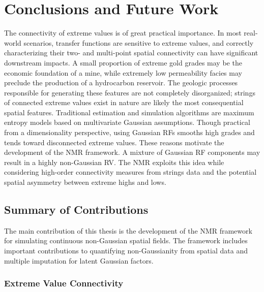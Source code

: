 
\chapter{Conclusions and Future Work}
\label{ch:07conclusions}

The connectivity of extreme values is of great practical importance. In most real-world scenarios, transfer functions are sensitive to extreme values, and correctly characterizing their two- and multi-point spatial connectivity can have significant downstream impacts. A small proportion of extreme gold grades may be the economic foundation of a mine, while extremely low permeability facies may preclude the production of a hydrocarbon reservoir. The geologic processes responsible for generating these features are not completely disorganized; strings of connected extreme values exist in nature are likely the most consequential spatial features. Traditional estimation and simulation algorithms are maximum entropy models based on multivariate Gaussian assumptions. Though practical from a dimensionality perspective, using Gaussian \glspl{RF} smooths high grades and tends toward disconnected extreme values. These reasons motivate the development of the \gls{NMR} framework. A mixture of Gaussian \gls{RF} components may result in a highly non-Gaussian \gls{RV}. The \gls{NMR} exploits this idea while considering high-order connectivity measures from strings data and the potential spatial asymmetry between extreme highs and lows.


\FloatBarrier
\section{Summary of Contributions}
\label{sec:07contrib}

The main contribution of this thesis is the development of the \gls{NMR} framework for simulating continuous non-Gaussian spatial fields. The framework includes important contributions to quantifying non-Gaussianity from spatial data and multiple imputation for latent Gaussian factors.

\subsection{Extreme Value Connectivity}
\label{subsec:07connect}

